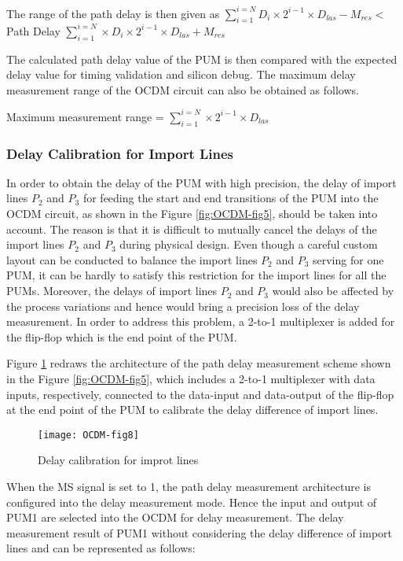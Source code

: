 The range of the path delay is then given as
$\sum_{i=1}^{i=N}D_{i} \times 2^{i-1} \times D_{las} - M_{res} <$ Path Delay $\sum_{i=1}^{i=N} \times D_{i} \times 2^{i-1} \times D_{las} + M_{res}$

The calculated path delay value of the PUM is then compared with the expected delay value for timing validation and silicon debug. The maximum delay measurement range of the OCDM circuit can also be obtained as follows.

Maximum measurement range = $\sum_{i=1}^{i=N} \times 2^{i-1} \times D_{las}$

\subsubsection{Delay Calibration for Import Lines}
In order to obtain the delay of the PUM with high precision, the delay of import lines $P_{2}$ and $P_{3}$ for feeding the start and end transitions of the PUM into the OCDM circuit, as shown in the Figure \ref{fig:OCDM-fig5}, should be taken into account. The reason is that it is difficult to mutually cancel the delays of the import lines $P_{2}$ and $P_{3}$ during physical design. Even though a careful custom layout can be conducted to balance the import lines $P_{2}$ and $P_{3}$ serving for one PUM, it can be hardly to satisfy this restriction for the import lines for all the PUMs. Moreover, the delays of import lines $P_{2}$ and $P_{3}$ would also be affected by the process variations and hence would bring a precision loss of the delay measurement. In order to address this problem, a 2-to-1 multiplexer is added for the flip-flop which is the end point of the PUM.


Figure \ref{fig:OCDM-fig8} redraws the architecture of the path delay measurement scheme shown in the Figure \ref{fig:OCDM-fig5}, which includes a 2-to-1 multiplexer with data inputs, respectively, connected to the data-input and data-output of the flip-flop at the end point of the PUM to calibrate the delay difference of import lines. 
\begin{figure}[t]
\centering
\texttt{[image: OCDM-fig8]}
    \caption{Delay calibration for improt lines}
    \label{fig:OCDM-fig8}
\end{figure}


When the MS signal is set to 1, the path delay measurement architecture is configured into the delay measurement mode. Hence the input and output of PUM1 are selected into the OCDM for delay measurement. The delay measurement result of PUM1 without considering the delay difference of import lines and can be represented as follows: 

